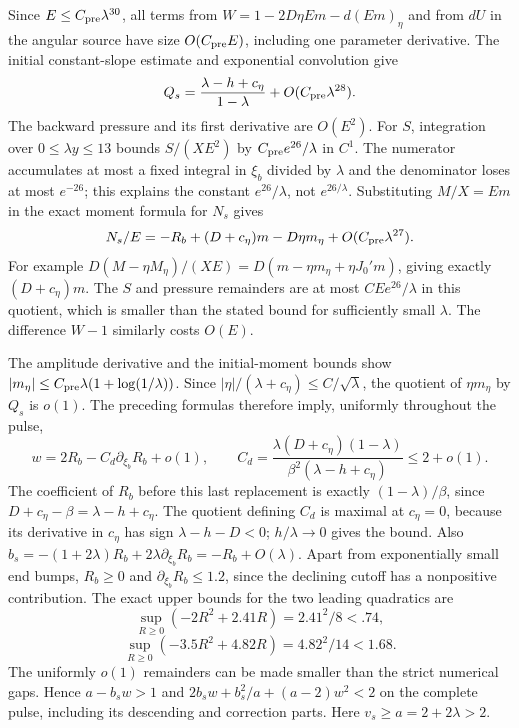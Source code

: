 \documentclass[10pt,a4paper]{article}
\begin{document}
Since $E\le C_{\rm pre}\lambda^{30}$, all terms from
$W=1-2D\eta Em-d(Em)_\eta$ and from $dU$ in the angular source have
size $O(C_{\rm pre}E)$, including one parameter derivative. The initial
constant-slope estimate and exponential convolution give
\[
Q_s=\frac{\lambda-h+c_\eta}{1-\lambda}+O(C_{\rm pre}\lambda^{28}).
\]
The backward pressure and its first derivative are $O(E^2)$.
For $S$, integration over $0\le\lambda y\le13$ bounds
$S/(XE^2)$ by $C_{\rm pre}e^{26}/\lambda$ in $C^1$.
The numerator accumulates at most a fixed integral in $\xi_b$ divided by
$\lambda$ and the denominator loses at most $e^{-26}$; this explains the
constant $e^{26}/\lambda$, not $e^{26/\lambda}$.
Substituting $M/X=Em$ in the exact moment formula for $N_s$ gives
\[
N_s/E=-R_b+(D+c_\eta)m-D\eta m_\eta+O(C_{\rm pre}\lambda^{27}).
\]
For example $D(M-\eta M_\eta)/(XE)
=D(m-\eta m_\eta+\eta J_0'm)$, giving exactly $(D+c_\eta)m$.
The $S$ and pressure remainders are at most $CEe^{26}/\lambda$ in this
quotient, which is smaller than the stated bound for sufficiently small
$\lambda$. The difference $W-1$ similarly costs $O(E)$.

The amplitude derivative and the initial-moment bounds show
$|m_\eta|\le C_{\rm pre}\lambda(1+\log(1/\lambda))$.
Since $|\eta|/(\lambda+c_\eta)\le C/\sqrt\lambda$,
the quotient of $\eta m_\eta$ by $Q_s$ is $o(1)$.
The preceding formulas therefore imply, uniformly throughout the pulse,
\[
w=2R_b-C_d\partial_{\xi_b}R_b+o(1),\qquad
C_d=\frac{\lambda(D+c_\eta)(1-\lambda)}
{\beta^2(\lambda-h+c_\eta)}\le2+o(1).
\]
The coefficient of $R_b$ before this last replacement is exactly
$(1-\lambda)/\beta$, since $D+c_\eta-\beta=\lambda-h+c_\eta$.
The quotient defining $C_d$ is maximal at $c_\eta=0$, because its derivative
in $c_\eta$ has sign $\lambda-h-D<0$; $h/\lambda\to0$ gives the bound.
Also $b_s=-(1+2\lambda)R_b+2\lambda\partial_{\xi_b}R_b=-R_b+O(\lambda)$.
Apart from exponentially small end bumps, $R_b\ge0$ and
$\partial_{\xi_b}R_b\le1.2$, since the declining cutoff has a nonpositive
contribution. The exact upper bounds for the two leading quadratics are
\[
\sup_{R\ge0}(-2R^2+2.41R)=2.41^2/8<.74,
\]
\[
\sup_{R\ge0}(-3.5R^2+4.82R)=4.82^2/14<1.68.
\]
The uniformly $o(1)$ remainders can be made smaller than the strict numerical
gaps. Hence $a-b_sw>1$ and
$2b_sw+b_s^2/a+(a-2)w^2<2$ on the complete pulse, including its descending
and correction parts. Here $v_s\ge a=2+2\lambda>2$.
\end{document}
